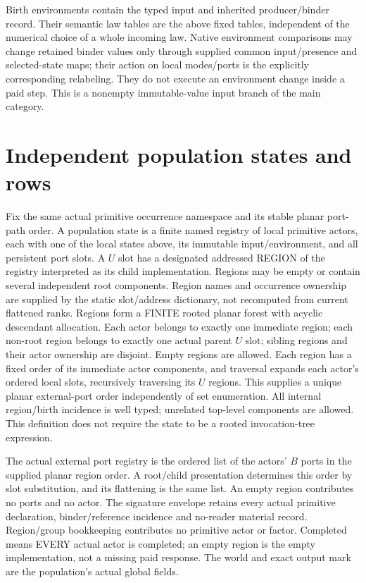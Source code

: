 \documentclass[11pt]{article}
\begin{document}
Birth environments contain the typed input and inherited producer/binder record. Their semantic law tables are the above fixed tables, independent of the numerical choice of a whole incoming law. Native environment comparisons may change retained binder values only through supplied common input/presence and selected-state maps; their action on local modes/ports is the explicitly corresponding relabeling. They do not execute an environment change inside a paid step. This is a nonempty immutable-value input branch of the main category.

\section{Independent population states and rows}
Fix the same actual primitive occurrence namespace and its stable planar port-path order. A population state is a finite named registry of local primitive actors, each with one of the local states above, its immutable input/environment, and all persistent port slots. A $U$ slot has a designated addressed REGION of the registry interpreted as its child implementation. Regions may be empty or contain several independent root components. Region names and occurrence ownership are supplied by the static slot/address dictionary, not recomputed from current flattened ranks. Regions form a FINITE rooted planar forest with acyclic descendant allocation. Each actor belongs to exactly one immediate region; each non-root region belongs to exactly one actual parent $U$ slot; sibling regions and their actor ownership are disjoint. Empty regions are allowed. Each region has a fixed order of its immediate actor components, and traversal expands each actor's ordered local slots, recursively traversing its $U$ regions. This supplies a unique planar external-port order independently of set enumeration. All internal region/birth incidence is well typed; unrelated top-level components are allowed. This definition does not require the state to be a rooted invocation-tree expression.

The actual external port registry is the ordered list of the actors' $B$ ports in the supplied planar region order. A root/child presentation determines this order by slot substitution, and its flattening is the same list. An empty region contributes no ports and no actor. The signature envelope retains every actual primitive declaration, binder/reference incidence and no-reader material record. Region/group bookkeeping contributes no primitive actor or factor. Completed means EVERY actual actor is completed; an empty region is the empty implementation, not a missing paid response. The world and exact output mark are the population's actual global fields.
\end{document}
